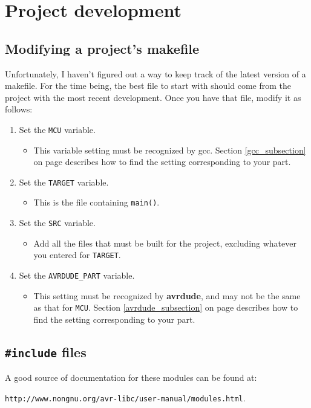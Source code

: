 \section{Project development}


\subsection{Modifying a project's makefile}
Unfortunately, I haven't figured out a way to keep track of the latest version of a makefile.  For the time being, the best file to start with should come from the project with the most recent development.  Once you have that file, modify it as follows:
\begin{enumerate}
    \item Set the \texttt{MCU} variable.
        \begin{itemize}
            \item This variable setting must be recognized by gcc.  Section \ref{gcc_subsection} on page \pageref{gcc_subsection} describes how to find the setting corresponding to your part.
        \end{itemize}
    \item Set the \texttt{TARGET} variable.
        \begin{itemize}
            \item This is the file containing \texttt{main()}.
        \end{itemize}
    \item Set the \texttt{SRC} variable.
        \begin{itemize}
            \item Add all the files that must be built for the project, excluding whatever you entered for \texttt{TARGET}.
        \end{itemize}
    \item Set the \texttt{AVRDUDE\_PART} variable.
        \begin{itemize}
            \item This setting must be recognized by \textbf{avrdude}, and may not be the same as that for \texttt{MCU}.  Section \ref{avrdude_subsection} on page \pageref{avrdude_subsection} describes how to find the setting corresponding to your part.
        \end{itemize}
\end{enumerate}

\subsection{\texttt{\#include} files}
A good source of documentation for these modules can be found at:
\begin{center}
\texttt{http://www.nongnu.org/avr-libc/user-manual/modules.html}.
\end{center}


